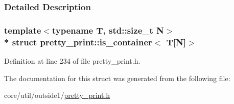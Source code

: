 \subsubsection{Detailed Description}
\subsubsection*{template$<$typename T, std\+::size\+\_\+t N$>$\\*
struct pretty\+\_\+print\+::is\+\_\+container$<$ T\mbox{[}\+N\mbox{]}$>$}



Definition at line 234 of file pretty\+\_\+print.\+h.



The documentation for this struct was generated from the following file\+:\begin{DoxyCompactItemize}
\item 
core/util/outside1/\hyperlink{pretty__print_8h}{pretty\+\_\+print.\+h}\end{DoxyCompactItemize}
